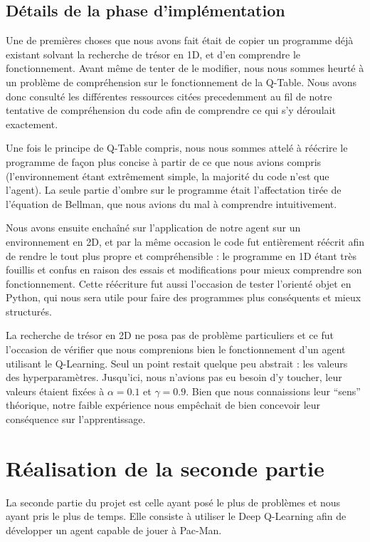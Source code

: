 \subsection{Détails de la phase d'implémentation}
Une de premières choses que nous avons fait était de copier un programme déjà existant solvant la recherche de trésor en 1D, et d'en comprendre le fonctionnement. Avant même de tenter de le modifier, nous nous sommes heurté à un problème de compréhension sur le fonctionnement de la Q-Table. Nous avons donc consulté les différentes ressources citées precedemment au fil de notre tentative de compréhension du code afin de comprendre ce qui s'y déroulait exactement.
\par
Une fois le principe de Q-Table compris, nous nous sommes attelé à réécrire le programme de façon plus concise à partir de ce que nous avions compris (l'environnement étant extrêmement simple, la majorité du code n'est que l'agent). La seule partie d'ombre sur le programme était l'affectation tirée de l'équation de Bellman, que nous avions du mal à comprendre intuitivement.
\par
Nous avons ensuite enchaîné sur l'application de notre agent sur un environnement en 2D, et par la même occasion le code fut entièrement réécrit afin de rendre le tout plus propre et compréhensible : le programme en 1D étant très fouillis et confus en raison des essais et modifications pour mieux comprendre son fonctionnement. Cette réécriture fut aussi l'occasion de tester l'orienté objet en Python, qui nous sera utile pour faire des programmes plus conséquents et mieux structurés.
\par
La recherche de trésor en 2D ne posa pas de problème particuliers et ce fut l'occasion de vérifier que nous comprenions bien le fonctionnement d'un agent utilisant le Q-Learning. Seul un point restait quelque peu abstrait : les valeurs des hyperparamètres. Jusqu'ici, nous n'avions pas eu besoin d'y toucher, leur valeurs étaient fixées à $\alpha=0.1$ et $\gamma=0.9$. Bien que nous connaissions leur ``sens'' théorique, notre faible expérience nous empêchait de bien concevoir leur conséquence sur l'apprentissage.

\section{Réalisation de la seconde partie}
La seconde partie du projet est celle ayant posé le plus de problèmes et nous ayant pris le plus de temps. Elle consiste à utiliser le Deep Q-Learning afin de développer un agent capable de jouer à Pac-Man.

